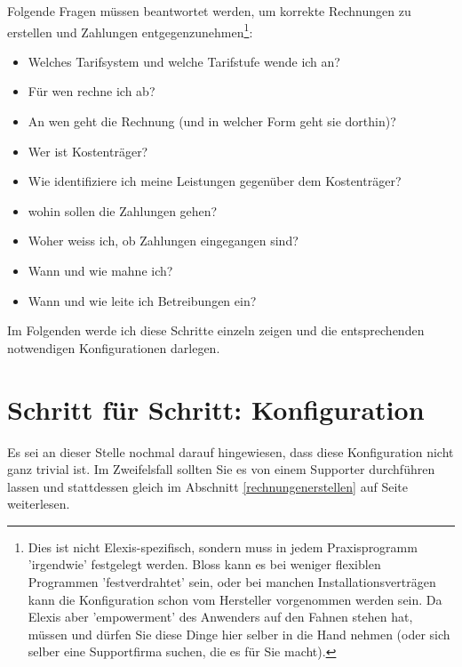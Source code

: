 \documentclass[a4paper]{scrartcl}
\begin{document}
Folgende Fragen müssen beantwortet werden, um korrekte Rechnungen zu erstellen und Zahlungen entgegenzunehmen\footnote{Dies ist nicht Elexis-spezifisch, sondern muss in jedem Praxisprogramm 'irgendwie' festgelegt werden. Bloss kann es bei weniger flexiblen Programmen 'festverdrahtet' sein, oder bei manchen Installationsverträgen kann die Konfiguration schon vom Hersteller vorgenommen werden sein. Da Elexis aber 'empowerment' des Anwenders auf den Fahnen stehen hat, müssen und dürfen Sie diese Dinge hier selber in die Hand nehmen (oder sich selber eine Supportfirma suchen, die es für Sie macht).}:

\begin{itemize}
\item Welches Tarifsystem und welche Tarifstufe wende ich an?
\item Für wen rechne ich ab?
\item An wen geht die Rechnung (und in welcher Form geht sie dorthin)?
\item Wer ist Kostenträger?
\item Wie identifiziere ich meine Leistungen gegenüber dem Kostenträger?
\item wohin sollen die Zahlungen gehen?
\item Woher weiss ich, ob Zahlungen eingegangen sind?
\item Wann und wie mahne ich?
\item Wann und wie leite ich Betreibungen ein?
\end{itemize}

Im Folgenden werde ich diese Schritte einzeln zeigen und die entsprechenden notwendigen Konfigurationen darlegen.

\section{Schritt für Schritt: Konfiguration}
Es sei an dieser Stelle nochmal darauf hingewiesen, dass diese Konfiguration nicht ganz trivial ist. Im Zweifelsfall sollten Sie es von einem Supporter durchführen lassen und stattdessen gleich im Abschnitt \ref{rechnungenerstellen} auf Seite \pageref{rechnungenerstellen} weiterlesen.

\medskip
\end{document}

